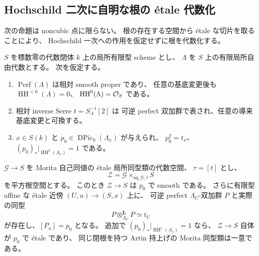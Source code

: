 \subsection{Hochschild 二次に自明な根の étale 代数化}
\label{subsec:hh2-etale-morita-root}

次の命題は noncubic 点に限らない。
根の存在する空間から étale な切片を取ることにより、
Hochschild 一次への作用を仮定せずに根を代数化する。

\begin{proposition}
\label{prop:hh2-etale-morita-root}
$S$ を標数零の代数閉体 $k$ 上の局所有限型 scheme とし、
$\Lambda$ を $S$ 上の有限局所自由代数とする。
次を仮定する。
\begin{enumerate}
\item $\operatorname{Perf}(\Lambda)$ は相対 smooth proper であり、
任意の基底変更後も
$\operatorname{HH}^{<0}(\Lambda)=0$、
$\operatorname{HH}^0(\Lambda)=\mathcal O_S$ である。
\item 相対 inverse Serre $t=S_\Lambda^{-1}[2]$ は
可逆 perfect 双加群で表され、任意の導来基底変更と可換する。
\item $x\in S(k)$ と
$p_0\in\operatorname{DPic}_k(\Lambda_x)$ が与えられ、
$p_0^2=t_x$、
$(p_0)_*|_{\operatorname{HH}^2(\Lambda_x)}=1$ である。
\end{enumerate}
$\mathcal G\to S$ を Morita 自己同値の étale 局所同型類の代数空間、
$\tau=[t]$ とし、
\[
 \mathcal Z=
 \mathcal G\times_{\mathrm{sq},\mathcal G,\tau}S
\]
を平方根空間とする。
このとき $\mathcal Z\to S$ は $p_0$ で smooth である。
さらに有限型 affine な étale 近傍 $(U,u)\to(S,x)$ 上に、
可逆 perfect $\Lambda_U$-双加群 $P$ と実際の同型
\[
 P\otimes_{\Lambda_U}^{\mathbf L}P\simeq t_U
 \tag{N-root}\label{eq:hh2-etale-actual-root}
\]
が存在し、$[P_u]=p_0$ となる。
追加で $(p_0)_*|_{\operatorname{HH}^1(\Lambda_x)}=1$ なら、
$\mathcal Z\to S$ 自体が $p_0$ で étale であり、
同じ閉根を持つ Artin 持上げの Morita 同型類は一意である。
\end{proposition}

